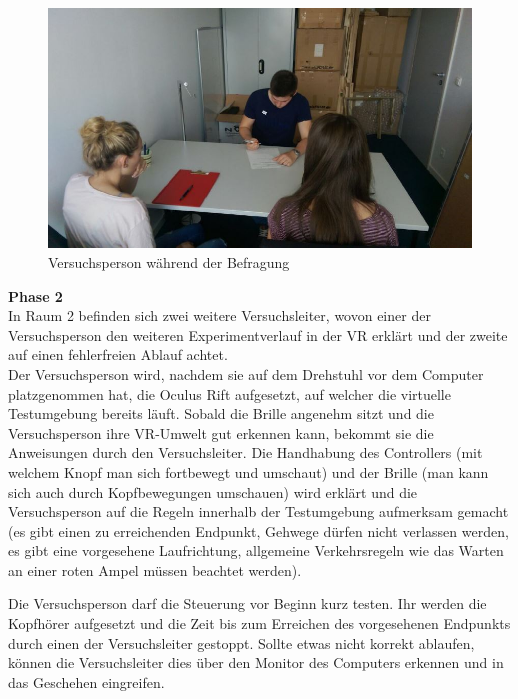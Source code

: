 \documentclass{Bericht}
\begin{document}
\begin{figure}[H]
	\centering    
	\includegraphics[height=\textheight, width=\linewidth, keepaspectratio]{../Bilder/t.jpg}
	\caption{Versuchsperson während der Befragung}
	\label{img:befragung}
\end{figure}

\textbf{Phase 2}\\ 
In Raum 2 befinden sich zwei weitere Versuchsleiter, wovon einer der Versuchsperson den weiteren Experimentverlauf in der VR erklärt und der zweite auf einen fehlerfreien Ablauf achtet.\\
Der Versuchsperson wird, nachdem sie auf dem Drehstuhl vor dem Computer platzgenommen hat, die Oculus Rift aufgesetzt, auf welcher die virtuelle Testumgebung bereits läuft. Sobald die Brille angenehm sitzt und die Versuchsperson ihre VR-Umwelt gut erkennen kann, bekommt sie die Anweisungen durch den Versuchsleiter. 
Die Handhabung des Controllers (mit welchem Knopf man sich fortbewegt und umschaut) und der Brille (man kann sich auch durch Kopfbewegungen umschauen) wird erklärt und die Versuchsperson auf die Regeln innerhalb der Testumgebung aufmerksam gemacht (es gibt einen zu erreichenden Endpunkt, Gehwege dürfen nicht verlassen werden, es gibt eine vorgesehene Laufrichtung, allgemeine Verkehrsregeln wie das Warten an einer roten Ampel müssen beachtet werden).  

Die Versuchsperson darf die Steuerung vor Beginn kurz testen. Ihr werden die Kopfhörer aufgesetzt und die Zeit bis zum Erreichen des vorgesehenen Endpunkts durch einen der Versuchsleiter gestoppt.
Sollte etwas nicht korrekt ablaufen, können die Versuchsleiter dies über den Monitor des Computers erkennen und in das Geschehen eingreifen.
\end{document}
